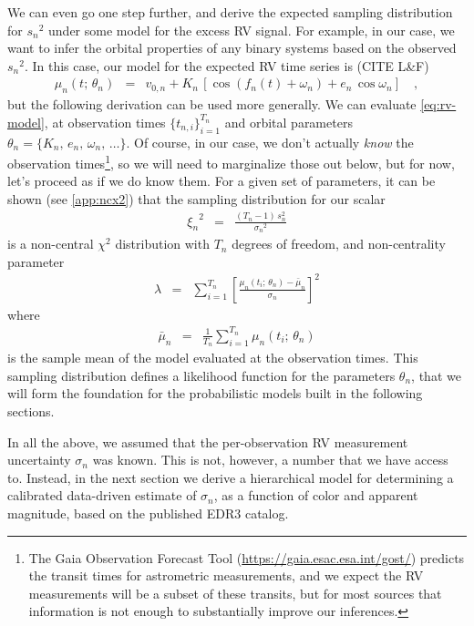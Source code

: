 \documentclass[modern, letterpaper]{aastex631}
\begin{document}
We can even go one step further, and derive the expected sampling distribution for ${s_n}^2$ under some model for the excess RV signal.
For example, in our case, we want to infer the orbital properties of any binary systems based on the observed ${s_n}^2$.
In this case, our model for the expected RV time series is (CITE L\&F)
\begin{eqnarray}
	\mu_n(t;\,\theta_n) &=& v_{0,n} + K_n\,\left[\cos(f_n(t) + \omega_n) + e_n\,\cos \omega_n\right] \quad,
	\label{eq:rv-model}
\end{eqnarray}
but the following derivation can be used more generally.
We can evaluate \autoref{eq:rv-model}, at observation times $\{t_{n,i}\}_{i=1}^{T_n}$ and orbital parameters $\theta_n=\{K_n,\,e_n,\,\omega_n,\,\ldots\}$.
Of course, in our case, we don't actually \emph{know} the observation times\footnote{The Gaia Observation Forecast Tool (\url{https://gaia.esac.esa.int/gost/}) predicts the transit times for astrometric measurements, and we expect the RV measurements will be a subset of these transits, but for most sources that information is not enough to substantially improve our inferences.}, so we will need to marginalize those out below, but for now, let's proceed as if we do know them.
For a given set of parameters, it can be shown (see \autoref{app:ncx2}) that the sampling distribution for our scalar
\begin{eqnarray}
	{\xi_n}^2 &=& \frac{(T_n - 1)\,s_n^2}{{\sigma_n}^2}
	\label{eq:chi-sq-samp2}
\end{eqnarray}
is a non-central $\chi^2$ distribution with $T_n$ degrees of freedom, and non-centrality parameter
\begin{eqnarray}
	\lambda &=& \sum_{i=1}^{T_n} \left[\frac{\mu_n(t_i;\,\theta_n) - \bar{\mu}_n}{\sigma_n}\right]^2
	\label{eq:ncx2-nc-param}
\end{eqnarray}
where
\begin{eqnarray}
	\bar{\mu}_n &=& \frac{1}{T_n}\sum_{i=1}^{T_n} \mu_n(t_i;\,\theta_n)
\end{eqnarray}
is the sample mean of the model evaluated at the observation times.
This sampling distribution defines a likelihood function for the parameters $\theta_n$, that we will form the foundation for the probabilistic models built in the following sections.

In all the above, we assumed that the per-observation RV measurement uncertainty $\sigma_n$ was known.
This is not, however, a number that we have access to.
Instead, in the next section we derive a hierarchical model for determining a calibrated data-driven estimate of $\sigma_n$, as a function of color and apparent magnitude, based on the published EDR3 catalog.
\end{document}

